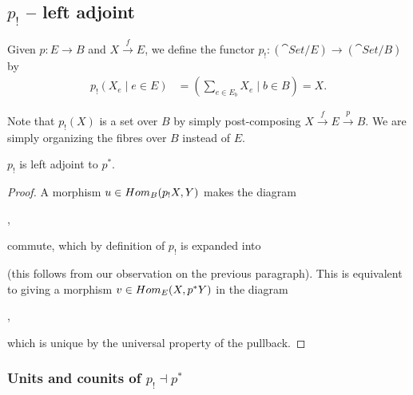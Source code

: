 \subsection{$p_!$ -- left adjoint}
Given $p: E\to B$ and $X\overset{f}{\to} E$, we define the functor $p_! : (\cat{Set}/ E)\to(\cat{Set}/ B)$ by
\begin{align*}
	p_!\left( X_e \mid e\in E \right) &= \left( \sum_{e\in E_b} X_e \mid b\in B \right) = X.
\end{align*}

Note that $p_!(X)$ is a set over $B$ by simply post-composing $X\overset{f}{\to} E\overset{p}{\to} B$. We are simply organizing the fibres over $B$ instead of $E$.

\begin{proposition}
	$p_!$ is left adjoint to $p^*$.
\end{proposition}
\begin{proof}
	A morphism $u\in Hom_B(p_!X,Y)$ makes the diagram
	\begin{center}
	,
	\end{center}
	commute, which by definition of $p_!$ is expanded into
	\begin{center}
	\end{center}
	(this follows from our observation on the previous paragraph). This is equivalent to giving a morphism $v\in Hom_E(X,p^*Y)$ in the diagram
	\begin{center}
	,
	\end{center}
	which is unique by the universal property of the pullback.
\end{proof}


\subsubsection{Units and counits of $p_! \dashv p^*$}

